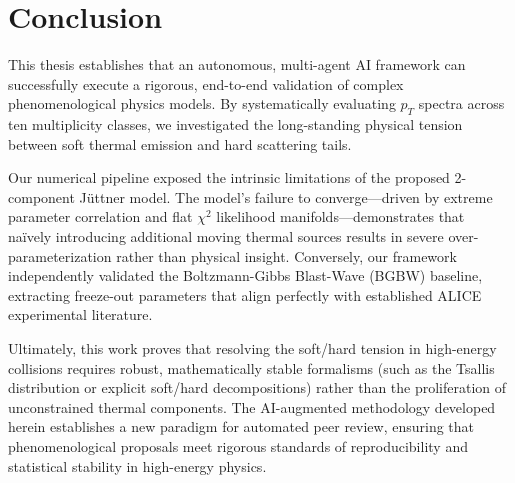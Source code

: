 \chapter{Conclusion}
\label{ch:conclusion}

This thesis establishes that an autonomous, multi-agent AI framework can successfully execute a rigorous, end-to-end validation of complex phenomenological physics models. By systematically evaluating $p_T$ spectra across ten multiplicity classes, we investigated the long-standing physical tension between soft thermal emission and hard scattering tails.

Our numerical pipeline exposed the intrinsic limitations of the proposed 2-component J\"uttner model. The model's failure to converge—driven by extreme parameter correlation and flat $\chi^2$ likelihood manifolds—demonstrates that na\"ively introducing additional moving thermal sources results in severe over-parameterization rather than physical insight. Conversely, our framework independently validated the Boltzmann-Gibbs Blast-Wave (BGBW) baseline, extracting freeze-out parameters that align perfectly with established ALICE experimental literature.

Ultimately, this work proves that resolving the soft/hard tension in high-energy collisions requires robust, mathematically stable formalisms (such as the Tsallis distribution or explicit soft/hard decompositions) rather than the proliferation of unconstrained thermal components. The AI-augmented methodology developed herein establishes a new paradigm for automated peer review, ensuring that phenomenological proposals meet rigorous standards of reproducibility and statistical stability in high-energy physics.
